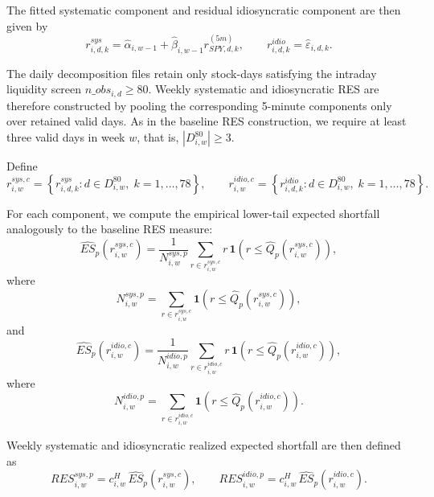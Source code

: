 \documentclass[11pt,a4paper]{article}
\begin{document}
The fitted systematic component and residual idiosyncratic component are
then given by
\begin{equation}
r_{i,d,k}^{sys}
=
\hat{\alpha}_{i,w-1}
+
\hat{\beta}_{i,w-1}r_{SPY,d,k}^{(5m)},
\qquad
r_{i,d,k}^{idio}
=
\hat{\varepsilon}_{i,d,k}.
\label{eq:decomp_ret}
\end{equation}

The daily decomposition files retain only stock-days satisfying the
intraday liquidity screen \(n\_obs_{i,d}\ge 80\). Weekly systematic and
idiosyncratic RES are therefore constructed by pooling the corresponding
5-minute components only over retained valid days. As in the baseline
RES construction, we require at least three valid days in week \(w\),
that is, \(|D^{80}_{i,w}|\ge 3\).

Define
\begin{equation}
r_{i,w}^{sys,c}
=
\left\{
r_{i,d,k}^{sys}: d\in D^{80}_{i,w},\; k=1,\dots,78
\right\},
\qquad
r_{i,w}^{idio,c}
=
\left\{
r_{i,d,k}^{idio}: d\in D^{80}_{i,w},\; k=1,\dots,78
\right\}.
\label{eq:pooled_decomp}
\end{equation}

For each component, we compute the empirical lower-tail expected
shortfall analogously to the baseline RES measure:
\begin{equation}
\widehat{ES}_{p}(r_{i,w}^{sys,c})
=
\frac{1}{N_{i,w}^{sys,p}}
\sum_{r\in r_{i,w}^{sys,c}}
r\,
\mathbf{1}\!\left(r\le \widehat{Q}_{p}(r_{i,w}^{sys,c})\right),
\label{eq:es_sys}
\end{equation}
where
\begin{equation}
N_{i,w}^{sys,p}
=
\sum_{r\in r_{i,w}^{sys,c}}
\mathbf{1}\!\left(r\le \widehat{Q}_{p}(r_{i,w}^{sys,c})\right),
\label{eq:tailcount_sys}
\end{equation}
and
\begin{equation}
\widehat{ES}_{p}(r_{i,w}^{idio,c})
=
\frac{1}{N_{i,w}^{idio,p}}
\sum_{r\in r_{i,w}^{idio,c}}
r\,
\mathbf{1}\!\left(r\le \widehat{Q}_{p}(r_{i,w}^{idio,c})\right),
\label{eq:es_idio}
\end{equation}
where
\begin{equation}
N_{i,w}^{idio,p}
=
\sum_{r\in r_{i,w}^{idio,c}}
\mathbf{1}\!\left(r\le \widehat{Q}_{p}(r_{i,w}^{idio,c})\right).
\label{eq:tailcount_idio}
\end{equation}

Weekly systematic and idiosyncratic realized expected shortfall are then
defined as
\begin{equation}
RES_{i,w}^{sys,p}
=
c_{i,w}^{H}\,\widehat{ES}_{p}(r_{i,w}^{sys,c}),
\qquad
RES_{i,w}^{idio,p}
=
c_{i,w}^{H}\,\widehat{ES}_{p}(r_{i,w}^{idio,c}).
\label{eq:res_decomp}
\end{equation}
\end{document}
